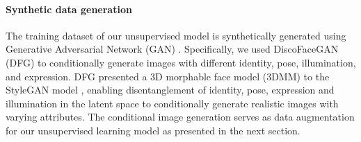 \documentclass[10pt,twocolumn,letterpaper]{ieeeconf}
\begin{document}
\paragraph{Synthetic data generation}
\label{sec:syn_data_generation}
The training dataset of our unsupervised model is synthetically generated using Generative Adversarial Network (GAN) \cite{GAN}. Specifically, we used DiscoFaceGAN (DFG) \cite{DiscoFaceGAN} to conditionally generate  images with different identity, pose, illumination, and expression. 
DFG presented a 3D morphable face model (3DMM) \cite{3DMM} to the StyleGAN model \cite{StyleGAN}, enabling disentanglement of identity, pose, expression and illumination in the latent space to conditionally generate realistic images with varying attributes. 
The conditional image generation serves as data augmentation for our unsupervised learning model as presented in the next section. 
\end{document}
